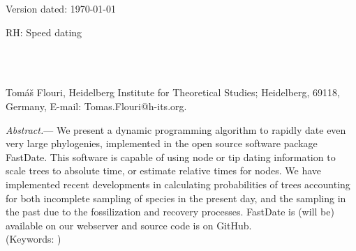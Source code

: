 \documentclass{llncs}
\newcommand{\ejmcomment}[1]{{\color{green} #1}}
\renewcommand{\subsubsection}[1]{%
\vspace{2ex}
\noindent
\textit{#1.}---}
\begin{document}
\begin{flushright}
Version dated: \today
\end{flushright}
\bigskip
\noindent RH: Speed dating


\bigskip
\medskip
\begin{center}

\bigskip




\\
\\
\end{center}
\medskip
{} Tom\'{a}\v{s} Flouri, 
Heidelberg Institute for Theoretical Studies; Heidelberg, 69118, Germany, E-mail: Tomas.Flouri@h-its.org.\\


\vspace{1in}

\subsubsection{Abstract} We present a dynamic programming algorithm to rapidly
date even very large phylogenies, implemented in the open source software package FastDate. 
This software is capable of using node or tip dating information to scale trees to absolute time,
or estimate relative times for nodes.
We have implemented recent developments in calculating probabilities of trees accounting for both incomplete 
sampling of species in the present day, and the sampling in the past due to the fossilization and recovery processes.
FastDate is \ejmcomment{(will be)} available on our webserver and source code is on GitHub.\\
\noindent (Keywords: )\\
\end{document}
